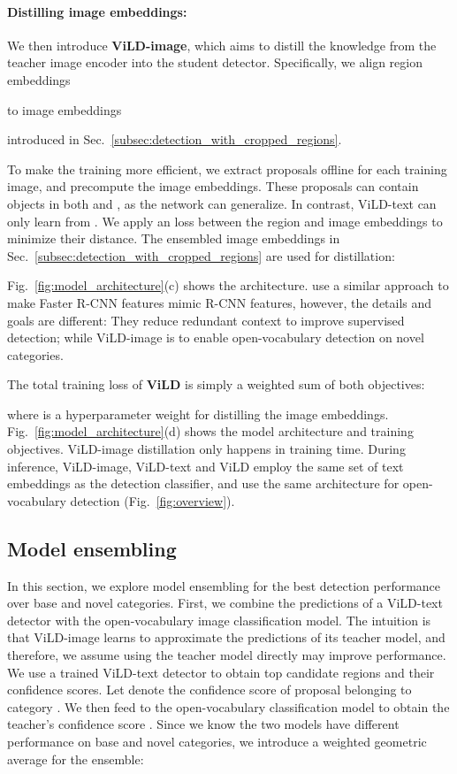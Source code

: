 \documentclass{article} \usepackage{iclr2022_conference,times}
\begin{document}
\paragraph{Distilling image embeddings:}
We then introduce \textbf{ViLD-image}, which aims to distill the knowledge from the teacher image encoder  into the student detector.
Specifically, we align region embeddings
 
to image embeddings
 
introduced in Sec.~\ref{subsec:detection_with_cropped_regions}.

To make the training more efficient, we extract  proposals  offline for each training image, and precompute the  image embeddings. These proposals can contain objects in both  and , as the network can generalize. 
In contrast, ViLD-text can only learn from .
We apply an  loss between the region and image embeddings to minimize their distance.
The ensembled image embeddings in Sec.~\ref{subsec:detection_with_cropped_regions} are used for distillation:

Fig.~\ref{fig:model_architecture}(c) shows the architecture. \citet{zhu2019deformable} use a similar approach to make Faster R-CNN features mimic R-CNN features, however, the details and goals are different: They reduce redundant context to improve supervised detection; while ViLD-image is to enable open-vocabulary detection on novel categories.


The total training loss of \textbf{ViLD} is simply a weighted sum of both objectives:

where  is a hyperparameter weight for distilling the image embeddings.
Fig.~\ref{fig:model_architecture}(d) shows the model architecture and training objectives. 
ViLD-image distillation only happens in training time.
During inference, ViLD-image, ViLD-text and ViLD employ the same set of text embeddings as the detection classifier, and use the same architecture for open-vocabulary detection (Fig.~\ref{fig:overview}).


\subsection{Model ensembling}\label{subsec:ensembling}
In this section, we explore model ensembling for the best detection performance over base and novel categories. 
First, we combine the predictions of a ViLD-text detector with the open-vocabulary image classification model. The intuition is that ViLD-image learns to approximate the predictions of its teacher model, and therefore, we assume using the teacher model directly may improve performance.
We use a trained ViLD-text detector to obtain top  candidate regions and their confidence scores. 
Let  denote the confidence score of proposal  belonging to category .
We then feed  to the open-vocabulary classification model to obtain the teacher's confidence score . 
Since we know the two models have different performance on base and novel categories, we introduce a weighted geometric average for the ensemble:
\end{document}
